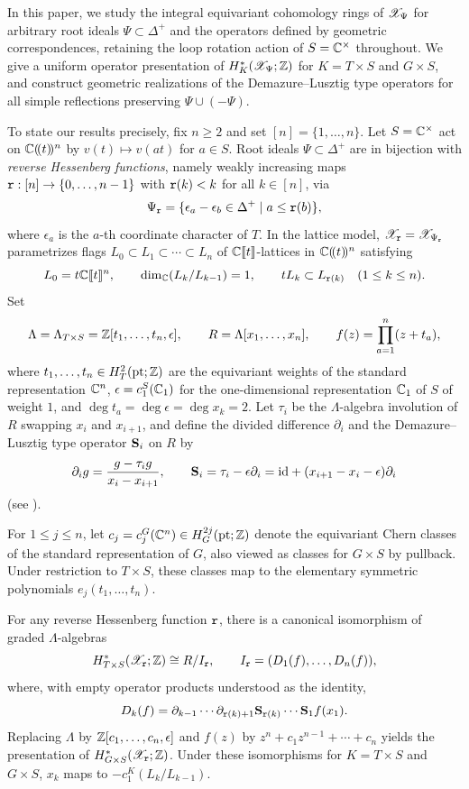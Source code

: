 In this paper, we study the integral equivariant cohomology rings of $\mathscr X_\Psi$ for arbitrary root ideals $\Psi\subset\Delta^+$ and the operators defined by geometric correspondences, retaining the loop rotation action of $S=\mathbb C^\times$ throughout. We give a uniform operator presentation of $H^*_K(\mathscr X_\Psi;\mathbb Z)$ for $K=T\times S$ and $G\times S$, and construct geometric realizations of the Demazure--Lusztig type operators for all simple reflections preserving $\Psi\cup(-\Psi)$.

To state our results precisely, fix $n\geq2$ and set $[n]=\{1,\dots,n\}$. Let $S=\mathbb C^\times$ act on $\mathbb C(\!(t)\!)^n$ by $v(t)\mapsto v(at)$ for $a\in S$. Root ideals $\Psi\subset\Delta^+$ are in bijection with \emph{reverse Hessenberg functions}, namely weakly increasing maps $\mathtt r:[n]\to\{0,\dots,n-1\}$ with $\mathtt r(k)<k$ for all $k\in[n]$, via
\[
 \Psi_{\mathtt r}=\{\epsilon_a-\epsilon_b\in\Delta^+\mid a\leq\mathtt r(b)\},
\]
where $\epsilon_a$ is the $a$-th coordinate character of $T$. In the lattice model, $\mathscr X_{\mathtt r}=\mathscr X_{\Psi_{\mathtt r}}$ parametrizes flags $L_0\subset L_1\subset\cdots\subset L_n$ of $\mathbb C\llbracket t\rrbracket$-lattices in $\mathbb C(\!(t)\!)^n$ satisfying
\[
 L_0=t\mathbb C\llbracket t\rrbracket^n,\qquad
 \dim_\mathbb C(L_k/L_{k-1})=1,\qquad
 tL_k\subset L_{\mathtt r(k)}\quad(1\leq k\leq n).
\]
Set
\[
 \Lambda=\Lambda_{T\times S}=\mathbb Z[t_1,\dots,t_n,\epsilon],\qquad
 R=\Lambda[x_1,\dots,x_n],\qquad
 f(z)=\prod_{a=1}^n(z+t_a),
\]
where $t_1,\dots,t_n\in H^2_T(\mathrm{pt};\mathbb Z)$ are the equivariant weights of the standard representation $\mathbb C^n$, $\epsilon=c_1^S(\mathbb C_1)$ for the one-dimensional representation $\mathbb C_1$ of $S$ of weight $1$, and $\deg t_a=\deg\epsilon=\deg x_k=2$. Let $\tau_i$ be the $\Lambda$-algebra involution of $R$ swapping $x_i$ and $x_{i+1}$, and define the divided difference $\partial_i$ and the Demazure--Lusztig type operator $\mathbf S_i$ on $R$ by
\[
 \partial_i g=\frac{g-\tau_i g}{x_i-x_{i+1}},\qquad
 \mathbf S_i=\tau_i-\epsilon\partial_i
       =\mathrm{id}+(x_{i+1}-x_i-\epsilon)\partial_i
\]
(see \cite[\S12]{ginzburg1998geometric}).

For $1\leq j\leq n$, let $c_j=c_j^G(\mathbb C^n)\in H_G^{2j}(\mathrm{pt};\mathbb Z)$ denote the equivariant Chern classes of the standard representation of $G$, also viewed as classes for $G\times S$ by pullback. Under restriction to $T\times S$, these classes map to the elementary symmetric polynomials $e_j(t_1,\dots,t_n)$.

\begin{theorem}\label{thm:intro_ring}
For any reverse Hessenberg function $\mathtt r$, there is a canonical isomorphism of graded $\Lambda$-algebras
\[
 H^*_{T\times S}(\mathscr X_{\mathtt r};\mathbb Z)\cong R/I_{\mathtt r},\qquad
 I_{\mathtt r}=(D_1(f),\dots,D_n(f)),
\]
where, with empty operator products understood as the identity,
\[
 D_k(f)=\partial_{k-1}\cdots\partial_{\mathtt r(k)+1}
             \mathbf S_{\mathtt r(k)}\cdots\mathbf S_1 f(x_1).
\]
Replacing $\Lambda$ by $\mathbb Z[c_1,\dots,c_n,\epsilon]$ and $f(z)$ by $z^n+c_1z^{n-1}+\cdots+c_n$ yields the presentation of $H^*_{G\times S}(\mathscr X_{\mathtt r};\mathbb Z)$. Under these isomorphisms for $K=T\times S$ and $G\times S$, $x_k$ maps to $-c_1^K(L_k/L_{k-1})$.
\end{theorem}


